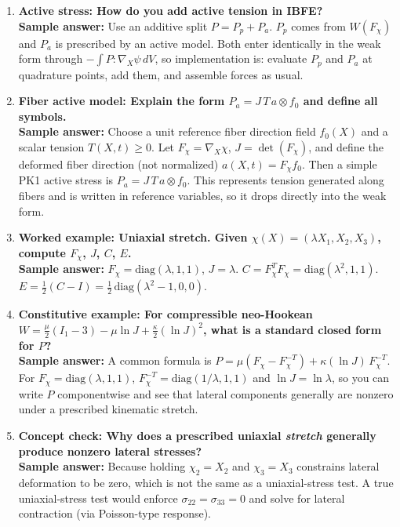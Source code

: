 \documentclass[12pt]{article}
\begin{document}
\begin{enumerate}
\item \textbf{Active stress: How do you add active tension in IBFE?}\\
\textbf{Sample answer:} Use an additive split $P=P_p+P_a$. $P_p$ comes from $W(F_\chi)$ and $P_a$ is prescribed by an
active model. Both enter identically in the weak form through $-\int P:\nabla_X\psi\, dV$, so implementation is: evaluate
$P_p$ and $P_a$ at quadrature points, add them, and assemble forces as usual.

\item \textbf{Fiber active model: Explain the form $P_a = J\,T\,a\otimes f_0$ and define all symbols.}\\
\textbf{Sample answer:} Choose a unit reference fiber direction field $f_0(X)$ and a scalar tension $T(X,t)\ge 0$.
Let $F_\chi=\nabla_X\chi$, $J=\det(F_\chi)$, and define the deformed fiber direction (not normalized) $a(X,t)=F_\chi f_0$.
Then a simple PK1 active stress is $P_a = J\,T\,a\otimes f_0$. This represents tension generated along fibers and is written
in reference variables, so it drops directly into the weak form.

\item \textbf{Worked example: Uniaxial stretch. Given $\chi(X)=(\lambda X_1, X_2, X_3)$, compute $F_\chi$, $J$, $C$, $E$.}\\
\textbf{Sample answer:} $F_\chi=\mathrm{diag}(\lambda,1,1)$, $J=\lambda$.
$C=F_\chi^T F_\chi=\mathrm{diag}(\lambda^2,1,1)$.
$E=\tfrac12(C-I)=\tfrac12\,\mathrm{diag}(\lambda^2-1,0,0)$.

\item \textbf{Constitutive example: For compressible neo-Hookean $W=\frac{\mu}{2}(I_1-3)-\mu\ln J +\frac{\kappa}{2}(\ln J)^2$,
what is a standard closed form for $P$?}\\
\textbf{Sample answer:} A common formula is
$P=\mu\left(F_\chi - F_\chi^{-T}\right) + \kappa(\ln J)\,F_\chi^{-T}$.
For $F_\chi=\mathrm{diag}(\lambda,1,1)$, $F_\chi^{-T}=\mathrm{diag}(1/\lambda,1,1)$ and $\ln J=\ln\lambda$, so you can write
$P$ componentwise and see that lateral components generally are nonzero under a prescribed kinematic stretch.

\item \textbf{Concept check: Why does a prescribed uniaxial \emph{stretch} generally produce nonzero lateral stresses?}\\
\textbf{Sample answer:} Because holding $\chi_2=X_2$ and $\chi_3=X_3$ constrains lateral deformation to be zero, which is
not the same as a uniaxial-stress test. A true uniaxial-stress test would enforce $\sigma_{22}=\sigma_{33}=0$ and solve for
lateral contraction (via Poisson-type response).



\end{enumerate}
\end{document}
